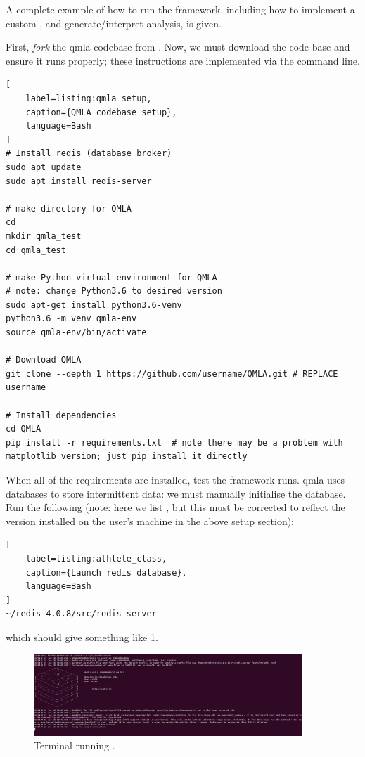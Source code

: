 A complete example of how to run the  framework, 
    including how to implement a custom , 
    and generate/interpret analysis, is given.
\par 

First, \emph{fork} the \gls{qmla} codebase from \cite{flynn2021QMLA}\footnotemark.
Now, we must download the code base and ensure it runs properly;
    these instructions are implemented via the command line\footnotemark. 
    
\begin{lstlisting}[
    label=listing:qmla_setup,
    caption={QMLA codebase setup},
    language=Bash
]
# Install redis (database broker)
sudo apt update
sudo apt install redis-server
 
# make directory for QMLA
cd
mkdir qmla_test
cd qmla_test

# make Python virtual environment for QMLA
# note: change Python3.6 to desired version
sudo apt-get install python3.6-venv 
python3.6 -m venv qmla-env    
source qmla-env/bin/activate

# Download QMLA
git clone --depth 1 https://github.com/username/QMLA.git # REPLACE username

# Install dependencies
cd QMLA 
pip install -r requirements.txt  # note there may be a problem with matplotlib version; just pip install it directly
\end{lstlisting}

When all of the requirements are installed, test the framework runs. 
\gls{qmla} uses  databases to store intermittent data:
    we must manually initialise the database. 
Run the following 
    (note: here we list , but this must be corrected to reflect the 
    version installed on the user's machine in the above setup section):
\begin{lstlisting}[
    label=listing:athlete_class,
    caption={Launch redis database},
    language=Bash
]
~/redis-4.0.8/src/redis-server
\end{lstlisting}

which should give something like \cref{fig:terminal_redis}.
\begin{figure}
    \begin{center}
        \includegraphics[width=0.9\textwidth]{appendix/figures/terminal_redis.png}
    \end{center}
    \label{fig:terminal_redis}
    \caption[Terminal running redis-server]{Terminal running .}
\end{figure}
\par 

